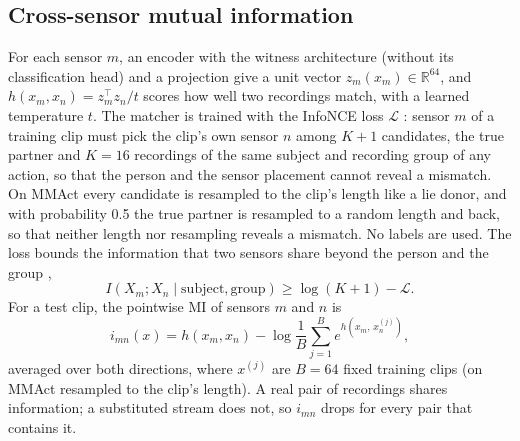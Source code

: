 \documentclass[conference]{IEEEtran}
\begin{document}
\subsection{Cross-sensor mutual information}
For each sensor $m$, an encoder with the witness architecture (without its classification head) and a projection give a unit vector $z_m(x_m)\in\mathbb{R}^{64}$, and $h(x_m,x_n)=z_m^{\top}z_n/t$ scores how well two recordings match, with a learned temperature $t$. The matcher is trained with the InfoNCE loss $\mathcal{L}$ \cite{Ref18}: sensor $m$ of a training clip must pick the clip's own sensor $n$ among $K+1$ candidates, the true partner and $K=16$ recordings of the same subject and recording group of any action, so that the person and the sensor placement cannot reveal a mismatch. On MMAct every candidate is resampled to the clip's length like a lie donor, and with probability 0.5 the true partner is resampled to a random length and back, so that neither length nor resampling reveals a mismatch. No labels are used. The loss bounds the information that two sensors share beyond the person and the group \cite{Ref19},
\begin{equation}
I(X_m;X_n\mid \text{subject},\text{group})\geq \log(K+1)-\mathcal{L}. \label{eq:bound}
\end{equation}
For a test clip, the pointwise MI of sensors $m$ and $n$ is
\begin{equation}
i_{mn}(x)=h(x_m,x_n)-\log\frac{1}{B}\sum_{j=1}^{B}e^{h(x_m,\,x_n^{(j)})}, \label{eq:pmi}
\end{equation}
averaged over both directions, where $x^{(j)}$ are $B=64$ fixed training clips (on MMAct resampled to the clip's length). A real pair of recordings shares information; a substituted stream does not, so $i_{mn}$ drops for every pair that contains it.
\end{document}
